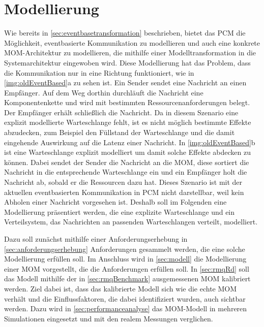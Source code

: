 
\chapter{Modellierung}
\label{ch:modellierung}
Wie bereits in \autoref{sec:eventbasetransformation} beschrieben, bietet das PCM die Möglichkeit, eventbasierte Kommunikation zu modellieren und auch eine konkrete MOM-Architektur zu modellieren, die mithilfe einer Modelltransformation in die Systemarchitektur eingewoben wird. Diese Modellierung hat das Problem, dass die Kommunikation nur in eine Richtung funktioniert, wie in \autoref{img:oldEventBased}a zu sehen ist. Ein Sender sendet eine Nachricht an einen Empfänger. Auf dem Weg dorthin durchläuft die Nachricht eine Komponentenkette und wird mit bestimmten Ressourcenanforderungen belegt. Der Empfänger erhält schließlich die Nachricht. Da in diesem Szenario eine explizit modellierte Warteschlange fehlt, ist es nicht möglich bestimmte Effekte abzudecken, zum Beispiel den Füllstand der Warteschlange und die damit eingehende Auswirkung auf die Latenz einer Nachricht. In \autoref{img:oldEventBased}b ist eine Warteschlange explizit modelliert um damit solche Effekte abdecken zu können. Dabei sendet der Sender die Nachricht an die MOM, diese sortiert die Nachricht in die entsprechende Warteschlange ein und ein Empfänger holt die Nachricht ab, sobald er die Ressourcen dazu hat. Dieses Szenario ist mit der aktuellen eventbasierten Kommunikation in PCM nicht darstellbar, weil kein Abholen einer Nachricht vorgesehen ist. Deshalb soll im Folgenden eine Modellierung präsentiert werden, die eine explizite Warteschlange und ein Verteilsystem, das Nachrichten an passenden Warteschlangen verteilt, modelliert.\par
Dazu soll zunächst mithilfe einer Anforderungserhebung in \autoref{sec:anforderungserhebung} Anforderungen gesammelt werden, die eine solche Modellierung erfüllen soll. Im Anschluss wird in \autoref{sec:modell} die Modellierung einer MOM vorgestellt, die die Anforderungen erfüllen soll. In \autoref{sec:rmqRd} soll das Modell mithilfe der in \autoref{sec:rmqBenchmark} ausgemessenen MOM kalibriert werden. Ziel dabei ist, dass das kalibrierte Modell sich wie die echte MOM verhält und die Einflussfaktoren, die dabei identifiziert wurden, auch sichtbar werden. Dazu wird in \autoref{sec:performanceanalyse} das MOM-Modell in mehreren Simulationen eingesetzt und mit den realem Messungen verglichen. 
